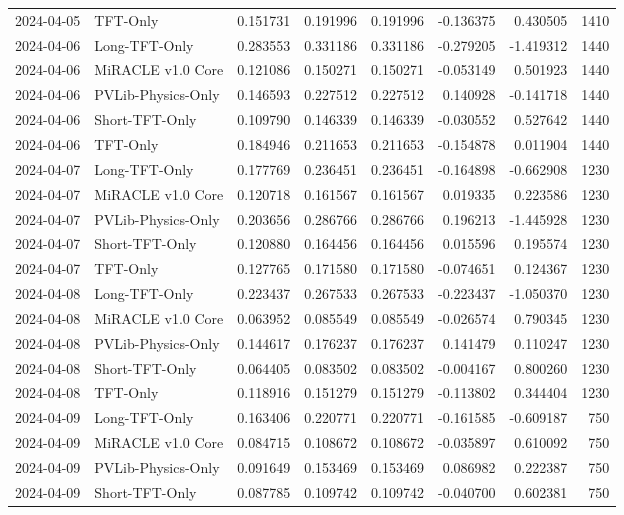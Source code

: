 \begin{tabular}{llrrrrrr}
2024-04-05 & TFT-Only & 0.151731 & 0.191996 & 0.191996 & -0.136375 & 0.430505 & 1410 \\
2024-04-06 & Long-TFT-Only & 0.283553 & 0.331186 & 0.331186 & -0.279205 & -1.419312 & 1440 \\
2024-04-06 & MiRACLE v1.0 Core & 0.121086 & 0.150271 & 0.150271 & -0.053149 & 0.501923 & 1440 \\
2024-04-06 & PVLib-Physics-Only & 0.146593 & 0.227512 & 0.227512 & 0.140928 & -0.141718 & 1440 \\
2024-04-06 & Short-TFT-Only & 0.109790 & 0.146339 & 0.146339 & -0.030552 & 0.527642 & 1440 \\
2024-04-06 & TFT-Only & 0.184946 & 0.211653 & 0.211653 & -0.154878 & 0.011904 & 1440 \\
2024-04-07 & Long-TFT-Only & 0.177769 & 0.236451 & 0.236451 & -0.164898 & -0.662908 & 1230 \\
2024-04-07 & MiRACLE v1.0 Core & 0.120718 & 0.161567 & 0.161567 & 0.019335 & 0.223586 & 1230 \\
2024-04-07 & PVLib-Physics-Only & 0.203656 & 0.286766 & 0.286766 & 0.196213 & -1.445928 & 1230 \\
2024-04-07 & Short-TFT-Only & 0.120880 & 0.164456 & 0.164456 & 0.015596 & 0.195574 & 1230 \\
2024-04-07 & TFT-Only & 0.127765 & 0.171580 & 0.171580 & -0.074651 & 0.124367 & 1230 \\
2024-04-08 & Long-TFT-Only & 0.223437 & 0.267533 & 0.267533 & -0.223437 & -1.050370 & 1230 \\
2024-04-08 & MiRACLE v1.0 Core & 0.063952 & 0.085549 & 0.085549 & -0.026574 & 0.790345 & 1230 \\
2024-04-08 & PVLib-Physics-Only & 0.144617 & 0.176237 & 0.176237 & 0.141479 & 0.110247 & 1230 \\
2024-04-08 & Short-TFT-Only & 0.064405 & 0.083502 & 0.083502 & -0.004167 & 0.800260 & 1230 \\
2024-04-08 & TFT-Only & 0.118916 & 0.151279 & 0.151279 & -0.113802 & 0.344404 & 1230 \\
2024-04-09 & Long-TFT-Only & 0.163406 & 0.220771 & 0.220771 & -0.161585 & -0.609187 & 750 \\
2024-04-09 & MiRACLE v1.0 Core & 0.084715 & 0.108672 & 0.108672 & -0.035897 & 0.610092 & 750 \\
2024-04-09 & PVLib-Physics-Only & 0.091649 & 0.153469 & 0.153469 & 0.086982 & 0.222387 & 750 \\
2024-04-09 & Short-TFT-Only & 0.087785 & 0.109742 & 0.109742 & -0.040700 & 0.602381 & 750 \\

\end{tabular}
